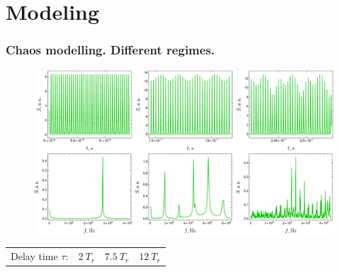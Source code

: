 \section{Modeling}


\begin{frame}
    \frametitle{Chaos modelling. Different regimes.}
    
    \begin{figure}
        \centering
        \includegraphics[width=\linewidth]{figures/chaos_and_spectra.pdf}
    \end{figure}
    
    \begin{center}
        \begin{tabular}{c|c|c}
            Delay time $\tau$:\ \   $2 \ T_r$ & $7.5 \ T_r$ & $12 \ T_r$
        \end{tabular}
    \end{center}

    
    
\end{frame} 

